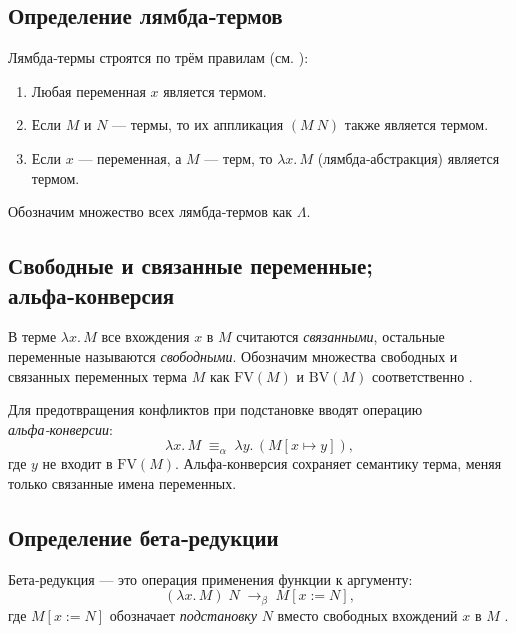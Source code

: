 

\subsection{Определение лямбда‑термов}
Лямбда‑термы строятся по трём правилам (см. \cite{Barendregt1984}):
\begin{enumerate}
  \item Любая переменная \(x\) является термом.
  \item Если \(M\) и \(N\) — термы, то их аппликация \((M\ N)\) также является термом.
  \item Если \(x\) — переменная, а \(M\) — терм, то \(\lambda x.\,M\) (лямбда‑абстракция) является термом.
\end{enumerate}
Обозначим множество всех лямбда‑термов как \(\Lambda\).  

\subsection{Свободные и связанные переменные; альфа‑конверсия}
В терме \(\lambda x.\,M\) все вхождения \(x\) в \(M\) считаются \emph{связанными}, остальные переменные называются \emph{свободными}. Обозначим множества свободных и связанных переменных терма \(M\) как \(\mathrm{FV}(M)\) и \(\mathrm{BV}(M)\) соответственно \cite{HindleySeldin2008}.  

Для предотвращения конфликтов при подстановке вводят операцию \emph{альфа‑конверсии}: 
\[
  \lambda x.\,M \;\equiv_\alpha\;\lambda y.\,(M[x\mapsto y]),
\]
где \(y\) не входит в \(\mathrm{FV}(M)\). Альфа‑конверсия сохраняет семантику терма, меняя только связанные имена переменных.

\subsection{Определение бета‑редукции}
Бета‑редукция — это операция применения функции к аргументу:
\[
  (\lambda x.\,M)\;N \;\to_\beta\; M[x := N],
\]
где \(M[x := N]\) обозначает \emph{подстановку} \(N\) вместо свободных вхождений \(x\) в \(M\) \cite{Pierce2002}.  

